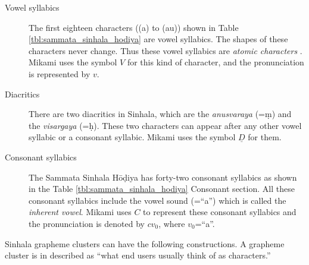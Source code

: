 \documentclass[english]{jnlp_1.3e}
\begin{document}
\begin{description}
\item[Vowel syllabics]
The first eighteen characters  ({\SHa{}}(a) to {\SHa{}}(au))  shown in Table \ref{tbl:sammata_sinhala_hodiya} are 
 vowel syllabics. 
The shapes of these  characters never change. 
Thus these vowel syllabics are {\it atomic characters} \cite{Unicode}. 
 Mikami uses  the   symbol $V$ for this kind of  character, and the pronunciation is represented by $v$.

\item[Diacritics]
There are two diacritics in  Sinhala,  which  are the {\it anusvaraya} ({\SHa{}}=\d{m}) and the  {\it visargaya} ({\SHa{}}=\d{h}). 
These two characters can appear after any other vowel syllabic or a consonant syllabic. 
Mikami uses the symbol $\underline{D}$ for them. 

\item[Consonant syllabics]
 The Sammata Sinhala H\={o}\d{d}iya  has forty-two  consonant syllabics  as shown in  the  Table \ref{tbl:sammata_sinhala_hodiya} Consonant section. 
All these   consonant syllabics  include the vowel sound {\SHa{}}(=``a'') which is called the  {\it inherent vowel}.  
Mikami uses $C$ to represent these   consonant syllabics  and the pronunciation is denoted by $cv_0$, where $v_0$=``a''.
\end{description}


Sinhala grapheme clusters can have the following constructions.
A grapheme cluster is in \cite{Unicode2} described as ``what end users usually think of as characters.''
\end{document}
